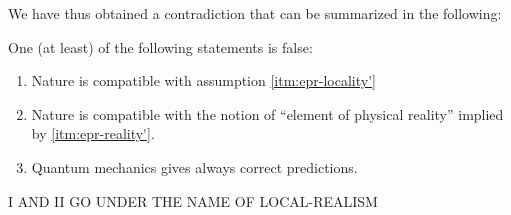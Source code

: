 We have thus obtained a contradiction that can be summarized in the following:
\begin{theorem}
  One (at least) of the following statements is false:
  \begin{enumerate}[label=(\roman*)]
  \item Nature is compatible with assumption \ref{itm:epr-locality'}
  \item Nature is compatible with the notion of ``element of physical reality'' implied by \ref{itm:epr-reality'}.
  \item Quantum mechanics gives always correct predictions.
  \end{enumerate}
\end{theorem}


I AND II GO UNDER THE NAME OF LOCAL-REALISM

